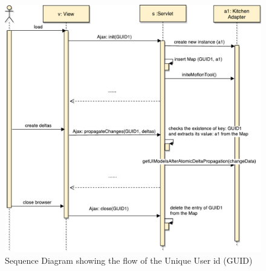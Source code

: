 \begin{figure}
	\centering
	\includegraphics[width=1\textwidth]{figures/Sequence_Diagram-GUID}
	\caption{Sequence Diagram showing the flow of the Unique User id (GUID)}
	\label{fig:Sequence_Diagram-GUID}
\end{figure}
